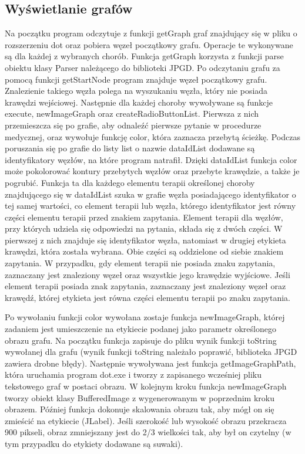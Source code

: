 \documentclass[oneside,a4paper]{book}
\begin{document}
\begin{spacing}{1.5}
\section{Wyświetlanie grafów}

Na początku program odczytuje z funkcji getGraph graf znajdujący się w pliku o rozszerzeniu dot oraz pobiera węzeł początkowy grafu. Operacje te wykonywane są dla każdej z wybranych chorób. Funkcja getGraph korzysta z funkcji parse obiektu klasy Parser należącego do biblioteki JPGD. Po odczytaniu grafu za pomocą funkcji getStartNode program znajduje węzeł początkowy grafu. Znalezienie takiego węzła polega na wyszukaniu węzła, który nie posiada krawędzi wejściowej. Następnie dla każdej choroby wywoływane są funkcje execute, newImageGraph oraz createRadioButtonList. Pierwsza z nich przemieszcza się po grafie, aby odnaleźć pierwsze pytanie w procedurze medycznej, oraz wywołuje funkcję color, która zaznacza przebytą ścieżkę. Podczas poruszania się po grafie do listy list o nazwie dataIdList dodawane są identyfikatory węzłów, na które program natrafił. Dzięki dataIdList funkcja color może pokolorować kontury przebytych węzłów oraz przebyte krawędzie, a także je pogrubić. Funkcja ta dla każdego elementu terapii określonej choroby znajdującego się w dataIdList szuka w grafie węzła posiadającego identyfikator o tej samej wartości, co element terapii lub węzła, którego identyfikator jest równy części elementu terapii przed znakiem zapytania. Element terapii dla węzłów, przy których udziela się odpowiedzi na pytania, składa się z dwóch części. W pierwszej z nich znajduje się identyfikator węzła, natomiast w drugiej etykieta krawędzi, która została wybrana. Obie części są oddzielone od siebie znakiem zapytania. W przypadku, gdy element terapii nie posiada znaku zapytania, zaznaczany jest znaleziony węzeł oraz wszystkie jego krawędzie wyjściowe.  Jeśli element terapii posiada znak zapytania, zaznaczany jest znaleziony węzeł oraz krawędź, której etykieta jest równa części elementu terapii po znaku zapytania.
 
Po wywołaniu funkcji color wywołana zostaje funkcja newImageGraph, której zadaniem jest umieszczenie na etykiecie podanej jako parametr określonego obrazu grafu. Na początku funkcja zapisuje do pliku wynik funkcji toString wywołanej dla grafu (wynik funkcji toString należało poprawić, biblioteka JPGD zawiera drobne błędy). Następnie wywoływana jest funkcja getImageGraphPath, która uruchamia program dot.exe i tworzy z zapisanego wcześniej pliku tekstowego graf w postaci obrazu. W kolejnym kroku funkcja newImageGraph tworzy obiekt klasy BufferedImage z wygenerowanym w poprzednim kroku obrazem. Później funkcja dokonuje skalowania obrazu tak, aby mógł on się zmieścić na etykiecie (JLabel). Jeśli szerokość lub wysokość obrazu przekracza 900 pikseli, obraz zmniejszany jest do 2/3 wielkości tak, aby był on czytelny (w tym przypadku do etykiety dodawane są suwaki).
 

\end{spacing}
\end{document}
